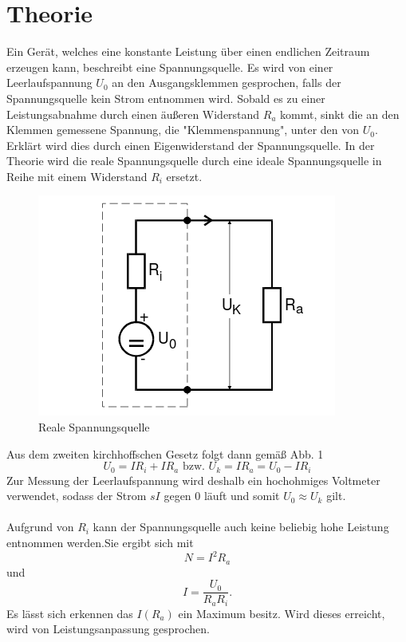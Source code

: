 \section{Theorie}
\label{sec:Theorie}

Ein Gerät, welches eine konstante Leistung über
einen endlichen Zeitraum erzeugen kann, beschreibt eine Spannungsquelle. Es wird von einer Leerlaufspannung $ U_0 $
an den Ausgangsklemmen gesprochen, falls der Spannungsquelle kein Strom entnommen wird.
Sobald es zu einer Leistungsabnahme durch einen äußeren Widerstand $ R_a $ kommt,
sinkt die an den Klemmen gemessene Spannung, die "Klemmenspannung", unter den von $ U_0 $. Erklärt wird
dies durch einen Eigenwiderstand der Spannungsquelle. In der Theorie wird die reale
Spannungsquelle durch eine ideale Spannungsquelle in Reihe mit einem Widerstand $ R_i$
ersetzt.
\begin{figure}[H]
  \centering

  \includegraphics[width=\linewidth-200pt,height=\textheight-200pt,keepaspectratio]{content/Spannungsquelle1.png}
  \caption{Reale Spannungsquelle}
  \label{fig:Spannung1}
\end{figure}

Aus dem zweiten kirchhoffschen Gesetz folgt dann gemäß Abb. 1
\begin{equation}
	 U_0 = I R_i + I R_a  \text{ bzw. } U_k = I R_a = U_0-IR_i
\end{equation}
Zur Messung der Leerlaufspannung wird deshalb ein hochohmiges Voltmeter verwendet,
sodass der Strom $sI$ gegen $0$ läuft und somit $U_0 \approx U_k$ gilt.\\
\\
Aufgrund von $R_i$ kann der Spannungsquelle auch keine beliebig hohe Leistung
entnommen werden.Sie ergibt sich mit
\begin{equation}
  N = I^2 R_a
  \end{equation}
  und
\begin{equation}
   I =\frac{U_0}{R_a R_i}\text{.}
 \end{equation}
  Es lässt sich erkennen das $I(R_a)$
  ein Maximum besitz. Wird dieses erreicht, wird von Leistungsanpassung gesprochen.
